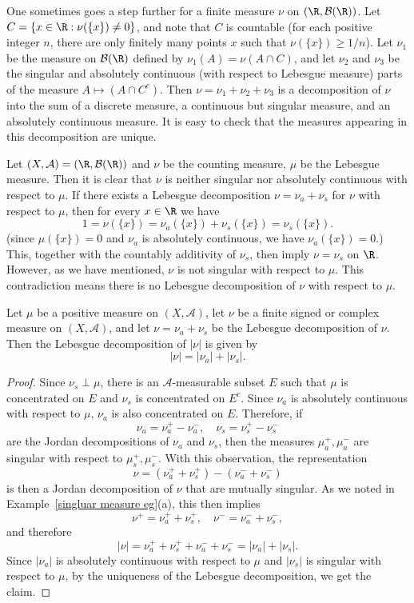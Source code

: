 One sometimes goes a step further for a finite measure $\nu$ on $(\R,\mathcal{B}(\R))$. Let $C=\{x\in\R:\nu(\{x\})\neq 0\}$, and note that $C$ is countable (for each positive integer $n$, there are only finitely many points $x$ such that $\nu(\{x\})\geq 1/n$). Let $\nu_1$ be the measure on $\mathcal{B}(\R)$ defined by $\nu_1(A)=\nu(A\cap C)$, and let $\nu_2$ and $\nu_3$ be the singular and absolutely continuous (with respect to Lebesgue measure) parts of the measure $A\mapsto(A\cap C^c)$. Then $\nu=\nu_1+\nu_2+\nu_3$ is a decomposition of $\nu$ into the sum of a discrete measure, a continuous but singular measure, and an absolutely continuous measure. It is easy to check that the measures appearing in this decomposition are unique.
\begin{example}
Let $(X,\mathcal{A})=(\R,\mathcal{B}(\R))$ and $\nu$ be the counting measure, $\mu$ be the Lebesgue measure. Then it is clear that $\nu$ is neither singular nor absolutely continuous with respect to $\mu$. If there exists a Lebesgue decomposition $\nu=\nu_a+\nu_s$ for $\nu$ with respect to $\mu$, then for every $x\in\R$ we have
\[1=\nu(\{x\})=\nu_a(\{x\})+\nu_s(\{x\})=\nu_s(\{x\}).\]
(since $\mu(\{x\})=0$ and $\nu_a$ is absolutely continuous, we have $\nu_a(\{x\})=0$.) This, together with the countably additivity of $\nu_s$, then imply $\nu=\nu_s$ on $\R$. However, as we have mentioned, $\nu$ is not singular with respect to $\mu$. This contradiction means there is no Lebesgue decomposition of $\nu$ with respect to $\mu$.
\end{example}
\begin{proposition}
Let $\mu$ be a positive measure on $(X,\mathcal{A})$, let $\nu$ be a finite signed or complex measure on $(X,\mathcal{A})$, and let $\nu=\nu_a+\nu_s$ be the Lebesgue decomposition of $\nu$. Then the Lebesgue decomposition of $|\nu|$ is given by
\[|\nu|=|\nu_a|+|\nu_s|.\]
\end{proposition}
\begin{proof}
Since $\nu_s\perp\mu$, there is an $\mathcal{A}$-measurable subset $E$ such that $\mu$ is concentrated on $E$ and $\nu_s$ is concentrated on $E^c$. Since $\nu_a$ is absolutely continuous with respect to $\mu$, $\nu_a$ is also concentrated on $E$. Therefore, if
\[\nu_a=\nu_a^+-\nu_a^-,\quad\nu_s=\nu_s^+-\nu_s^-\]
are the Jordan decompositions of $\nu_a$ and $\nu_s$, then the measures $\mu_a^+,\mu_a^-$ are singular with respect to $\mu_s^+,\mu_s^-$. With this observation, the representation
\[\nu=(\nu_a^++\nu_s^+)-(\nu_a^-+\nu_s^-)\]
is then a Jordan decomposition of $\nu$ that are mutually singular. As we noted in Example~\ref{singluar measure eg}(a), this then implies
\[\nu^+=\nu_a^++\nu_s^+,\quad \nu^-=\nu_a^-+\nu_s^-,\]
and therefore
\[|\nu|=\nu_a^++\nu_s^++\nu_a^-+\nu_s^-=|\nu_a|+|\nu_s|.\]
Since $|\nu_a|$ is absolutely continuous with respect to $\mu$ and $|\nu_s|$ is singular with respect to $\mu$, by the uniqueness of the Lebesgue decomposition, we get the claim.
\end{proof}
